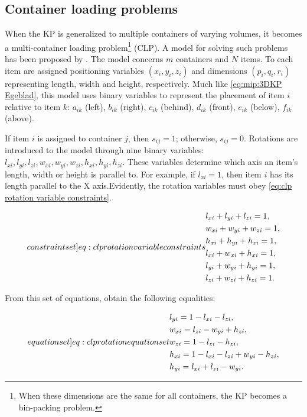 \subsection{Container loading problems}

When the KP is generalized to multiple containers of varying volumes, it becomes a multi-container loading problem\footnote{When these dimensions are the same for all containers, the KP becomes a bin-packing problem.} (CLP). A model for solving such problems has been proposed by \textcite{CHEN1995}. The model concerns $m$ containers and $N$ items. To each item are assigned positioning variables $(x_i, y_i, z_i)$ and dimensions $(p_i, q_i, r_i)$ representing length, width and height, respectively. Much like \cref{eq:mip:3DKP Egeblad}, this model uses binary variables to represent the placement of item $i$ relative to item $k$: $a_{ik}$ (left), $b_{ik}$ (right), $c_{ik}$ (behind), $d_{ik}$ (front), $e_{ik}$ (below), $f_{ik}$ (above).

If item $i$ is assigned to container $j$, then $s_{ij} = 1$; otherwise, $s_{ij} = 0$. Rotations are introduced to the model through nine binary variables: $l_{xi}, l_{yi}, l_{zi}, w_{xi}, w_{yi}, w_{zi}, h_{xi}, h_{yi}, h_{zi}$. These variables determine which axis an item's length, width or height is parallel to. For example, if $l_{xi} = 1$, then item $i$ has its length parallel to the X axis.Evidently, the rotation variables must obey \cref{eq:clp rotation variable constraints}.

\begin{subequations}
    \label[constraint set]{eq:clp rotation variable constraints}
    \begin{align}
        &l_{xi} + l_{yi} + l_{zi} = 1,\\
        &w_{xi} + w_{yi} + w_{zi} = 1,\\
        &h_{xi} + h_{yi} + h_{zi} = 1,\\
        &l_{xi} + w_{xi} + h_{xi} = 1,\\
        &l_{yi} + w_{yi} + h_{yi} = 1,\\
        &l_{zi} + w_{zi} + h_{zi} = 1.
    \end{align}
\end{subequations}

From this set of equations, \textcite{CHEN1995} obtain the following equalities:

\begin{subequations}
    \label[equation set]{eq:clp rotation equation set}
    \begin{align}
        &l_{yi} = 1 - l_{xi} - l_{zi},\\
        &w_{xi} = l_{zi} - w_{yi} + h_{zi},\\
        &w_{zi} = 1 - l_{zi} - h_{zi},\\
        &h_{xi} = 1 - l_{xi} - l_{zi} + w_{yi} - h_{zi},\\
        &h_{yi} = l_{xi} + l_{zi} - w_{yi}.
    \end{align}
\end{subequations}

